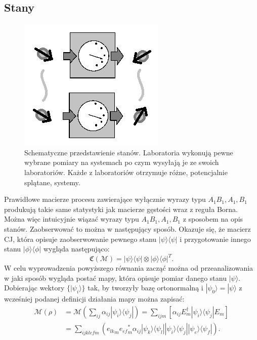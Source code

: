 \documentclass[10pt]{article} %
\newcommand{\Ket}[1]{|#1\rangle}
\newcommand{\Bra}[1]{\langle#1|}
\newcommand{\KP}{\Ket{\psi}}
\newcommand{\BP}{\Bra{\psi}}
\newcommand{\MCJ}{\mathfrak{C}}
\begin{document}
\subsection{Stany}
\begin{figure}[h]
\centering
\includegraphics{obrazki/states_new}
\caption{Schematyczne przedstawienie stanów. Laboratoria wykonują pewne wybrane pomiary na systemach po czym wysyłają je ze swoich laboratoriów. Każde z laboratoriów otrzymuje różne, potencjalnie splątane, systemy.}
\end{figure}
Prawidłowe macierze procesu zawierające wyłącznie wyrazy typu $A_1 B_1, A_1, B_1$ produkują takie same statystyki jak macierze gęstości wraz z reguła Borna. Można więc intuicyjnie wiązać wyrazy typu $A_1 B_1, A_1, B_1$ z sposobem na opis stanów. Zaobserwować to można w następujący sposób.
Okazuje się, że macierz CJ, która opisuje zaobserwowanie pewnego stanu $\KP\BP$ i przygotowanie innego stanu $\Ket{\phi}\Bra{\phi}$ wygląda następująco:
\begin{equation}
\MCJ(\mathcal{M}) = \KP\BP \otimes \Ket{\phi}\Bra{\phi}^T.
\end{equation}
W celu wyprowadzenia powyższego równania zacząć można od przeanalizowania w jaki sposób wygląda postać mapy, która opisuje pomiar danego stanu $\Ket{\psi}$. Dobierając wektory $\{ \Ket{\psi_i} \}$ tak, by tworzyły bazę ortonormalną i $\Ket{\psi_0} = \Ket{\psi}$ z wcześniej podanej definicji działania mapy można zapisać:
\begin{equation}
\begin{split}
\mathcal{M}(\rho) &= \mathcal{M}\left(\sum_{ij} \alpha_{ij} \Ket{\psi_i}\Bra{\psi_j}\right) = \sum_{ijm} \left[ \alpha_{ij} E^\dag_m \Ket{\psi_i}\Bra{\psi_j}E_m\right]\\
&= \sum_{ijklefm} \left( {e_{lk}}_m {e_{ef}}_m^*\alpha_{ij} \Ket{\psi_k}\Bra{\psi_l} \Ket{\psi_i}\Bra{\psi_j} \Ket{\psi_e}\Bra{\psi_f}\right). 
\end{split}
\end{equation}
\end{document}
